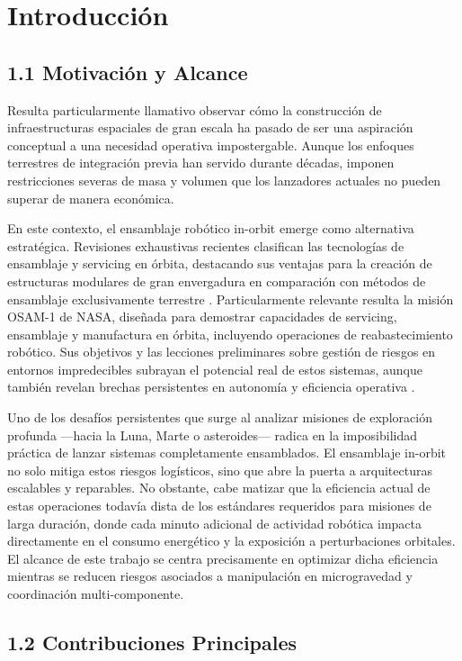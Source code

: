\section{Introducción}

\subsection{1.1 Motivación y Alcance}

Resulta particularmente llamativo observar cómo la construcción de infraestructuras espaciales de gran escala ha pasado de ser una aspiración conceptual a una necesidad operativa impostergable. Aunque los enfoques terrestres de integración previa han servido durante décadas, imponen restricciones severas de masa y volumen que los lanzadores actuales no pueden superar de manera económica. 

En este contexto, el ensamblaje robótico in-orbit emerge como alternativa estratégica. Revisiones exhaustivas recientes clasifican las tecnologías de ensamblaje y servicing en órbita, destacando sus ventajas para la creación de estructuras modulares de gran envergadura en comparación con métodos de ensamblaje exclusivamente terrestre \cite{Wang2025_OASR}. Particularmente relevante resulta la misión OSAM-1 de NASA, diseñada para demostrar capacidades de servicing, ensamblaje y manufactura en órbita, incluyendo operaciones de reabastecimiento robótico. Sus objetivos y las lecciones preliminares sobre gestión de riesgos en entornos impredecibles subrayan el potencial real de estos sistemas, aunque también revelan brechas persistentes en autonomía y eficiencia operativa \cite{NASA_OSAM1_2023}.

Uno de los desafíos persistentes que surge al analizar misiones de exploración profunda —hacia la Luna, Marte o asteroides— radica en la imposibilidad práctica de lanzar sistemas completamente ensamblados. El ensamblaje in-orbit no solo mitiga estos riesgos logísticos, sino que abre la puerta a arquitecturas escalables y reparables. No obstante, cabe matizar que la eficiencia actual de estas operaciones todavía dista de los estándares requeridos para misiones de larga duración, donde cada minuto adicional de actividad robótica impacta directamente en el consumo energético y la exposición a perturbaciones orbitales. El alcance de este trabajo se centra precisamente en optimizar dicha eficiencia mientras se reducen riesgos asociados a manipulación en microgravedad y coordinación multi-componente.

\subsection{1.2 Contribuciones Principales}

